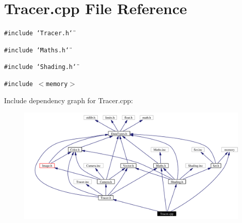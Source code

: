 \section{Tracer.cpp File Reference}
\label{Tracer_8cpp}
{\tt \#include \char`\"{}Tracer.h\char`\"{}}\par
{\tt \#include \char`\"{}Maths.h\char`\"{}}\par
{\tt \#include \char`\"{}Shading.h\char`\"{}}\par
{\tt \#include $<$memory$>$}\par


Include dependency graph for Tracer.cpp:\begin{figure}[H]
\begin{center}
\leavevmode
\includegraphics[width=363pt]{Tracer_8cpp__incl}
\end{center}
\end{figure}

